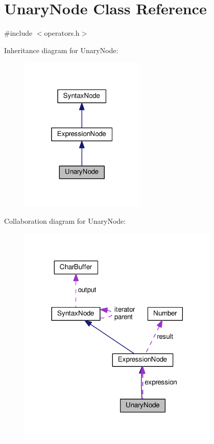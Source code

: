 \hypertarget{classUnaryNode}{}\section{Unary\+Node Class Reference}
\label{classUnaryNode}


{\ttfamily \#include $<$operators.\+h$>$}



Inheritance diagram for Unary\+Node\+:
\nopagebreak
\begin{figure}[H]
\begin{center}
\leavevmode
\includegraphics[width=169pt]{d4/d58/classUnaryNode__inherit__graph}
\end{center}
\end{figure}


Collaboration diagram for Unary\+Node\+:
\nopagebreak
\begin{figure}[H]
\begin{center}
\leavevmode
\includegraphics[width=272pt]{db/d98/classUnaryNode__coll__graph}
\end{center}
\end{figure}
